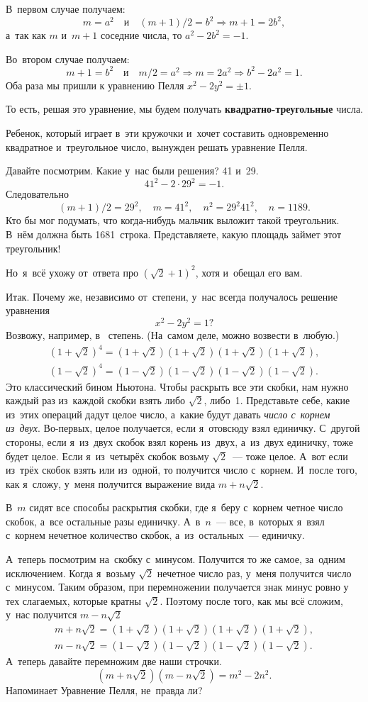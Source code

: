 В~первом случае получаем:
$$
m=a^{2}\quad
\text{и}\quad
(m+1)/2=b^{2} \Rightarrow m+1=2b^{2},
$$
а~так как $m$ и~$m+1$ соседние числа, то $a^{2}-2b^{2}=-1$.

Во~втором случае получаем:
$$
m+1=b^{2}\quad
\text{и}\quad
m/2=a^{2} \Rightarrow m=2a^{2} \Rightarrow b^{2}-2a^{2}=1.
$$
Оба раза мы пришли к уравнению Пелля $x^{2}-2y^{2}=\pm 1$.


То есть, решая это уравнение, мы будем получать \textbf{квадратно-треугольные} числа.

Ребенок, который играет в~эти кружочки и~хочет составить одновременно квадратное и~треугольное
число, вынужден решать уравнение Пелля.


Давайте посмотрим. Какие у~нас были решения? 41 и~29.
$$
41^{2}-2\cdot29^{2}=-1.
$$
Следовательно
$$
(m+1)/2=29^{2},\quad
m=41^{2},\quad
n^{2}=29^{2}41^{2},\quad
n=1189.
$$
Кто бы мог подумать, что когда-нибудь мальчик выложит такой треугольник. В~нём должна быть 1681~строка.
Представляете, какую площадь займет этот треугольник!

Но~я~всё ухожу от~ответа про $(\sqrt2+1)^{2}$, хотя и~обещал его вам.

Итак. Почему же, независимо от~степени, у~нас всегда получалось решение уравнения
$$
x^{2}-2y^{2}=1?
$$
Возвожу, например, в~ степень. (На~самом деле, можно возвести в~любую.)
\begin{gather*}
(1+\sqrt2)^{4}=
(1+\sqrt2)(1+\sqrt2)(1+\sqrt2)(1+\sqrt2),
\\
(1-\sqrt2)^{4}=(1-\sqrt2)(1-\sqrt2)(1-\sqrt2)(1-\sqrt2).
\end{gather*}
Это классический бином Ньютона. Чтобы раскрыть все эти скобки, нам нужно каждый раз из~каждой
скобки взять либо $\sqrt2$, либо~1. Представьте себе, какие из~этих операций дадут целое число, а~какие
будут давать \textit{число с~корнем из~двух}. Во-первых, целое получается, если я~отовсюду взял единичку.
С~другой стороны, если я~из~двух скобок взял корень из~двух, а~из~двух единичку, тоже будет целое.
Если я~из~четырёх скобок возьму $\sqrt2$~--- тоже целое. А~вот если из~трёх скобок взять или из~одной, то
получится число с~корнем. И~после того, как я~сложу, у~меня получится выражение вида $m+n{\sqrt2}$.

В~$m$ сидят все способы раскрытия скобки, где я~беру с~корнем четное число скобок, а~все остальные разы
единичку. А~в~$n$~--- все, в~которых я~взял с~корнем нечетное количество скобок, а~из~остальных~--- единичку.


А~теперь посмотрим на~скобку с~минусом. Получится то же самое, за~одним исключением. Когда я~возьму
$\sqrt2$ нечетное число раз, у~меня получится число с~минусом. Таким образом, при перемножении получается знак минус ровно
у тех слагаемых, которые кратны $\sqrt2$.
 Поэтому после того, как мы всё сложим, у~нас
получится $m-n{\sqrt2}$
\begin{gather*}
m+n{\sqrt2}=(1+\sqrt2)(1+\sqrt2)(1+\sqrt2)(1+\sqrt2),\\
m-n{\sqrt2}=(1-\sqrt2)(1-\sqrt2)(1-\sqrt2)(1-\sqrt2).
\end{gather*}
А~теперь давайте перемножим две наши строчки.
$$
(m+n{\sqrt2})(m-n{\sqrt2})=m^{2}-2n^{2}.
$$
Напоминает Уравнение Пелля, не~правда ли?

